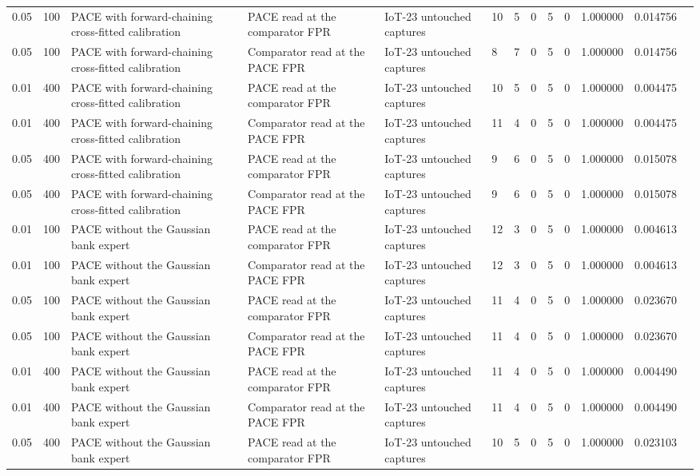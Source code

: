 \begin{tabular}{lllllllllllll}
0.05 & 100 & PACE with forward-chaining cross-fitted calibration & PACE read at the comparator FPR & IoT-23 untouched captures & 10 & 5 & 0 & 5 & 0 & 1.000000 & 0.014756 &  \\
0.05 & 100 & PACE with forward-chaining cross-fitted calibration & Comparator read at the PACE FPR & IoT-23 untouched captures & 8 & 7 & 0 & 5 & 0 & 1.000000 & 0.014756 &  \\
0.01 & 400 & PACE with forward-chaining cross-fitted calibration & PACE read at the comparator FPR & IoT-23 untouched captures & 10 & 5 & 0 & 5 & 0 & 1.000000 & 0.004475 &  \\
0.01 & 400 & PACE with forward-chaining cross-fitted calibration & Comparator read at the PACE FPR & IoT-23 untouched captures & 11 & 4 & 0 & 5 & 0 & 1.000000 & 0.004475 &  \\
0.05 & 400 & PACE with forward-chaining cross-fitted calibration & PACE read at the comparator FPR & IoT-23 untouched captures & 9 & 6 & 0 & 5 & 0 & 1.000000 & 0.015078 &  \\
0.05 & 400 & PACE with forward-chaining cross-fitted calibration & Comparator read at the PACE FPR & IoT-23 untouched captures & 9 & 6 & 0 & 5 & 0 & 1.000000 & 0.015078 &  \\
0.01 & 100 & PACE without the Gaussian bank expert & PACE read at the comparator FPR & IoT-23 untouched captures & 12 & 3 & 0 & 5 & 0 & 1.000000 & 0.004613 &  \\
0.01 & 100 & PACE without the Gaussian bank expert & Comparator read at the PACE FPR & IoT-23 untouched captures & 12 & 3 & 0 & 5 & 0 & 1.000000 & 0.004613 &  \\
0.05 & 100 & PACE without the Gaussian bank expert & PACE read at the comparator FPR & IoT-23 untouched captures & 11 & 4 & 0 & 5 & 0 & 1.000000 & 0.023670 &  \\
0.05 & 100 & PACE without the Gaussian bank expert & Comparator read at the PACE FPR & IoT-23 untouched captures & 11 & 4 & 0 & 5 & 0 & 1.000000 & 0.023670 &  \\
0.01 & 400 & PACE without the Gaussian bank expert & PACE read at the comparator FPR & IoT-23 untouched captures & 11 & 4 & 0 & 5 & 0 & 1.000000 & 0.004490 &  \\
0.01 & 400 & PACE without the Gaussian bank expert & Comparator read at the PACE FPR & IoT-23 untouched captures & 11 & 4 & 0 & 5 & 0 & 1.000000 & 0.004490 &  \\
0.05 & 400 & PACE without the Gaussian bank expert & PACE read at the comparator FPR & IoT-23 untouched captures & 10 & 5 & 0 & 5 & 0 & 1.000000 & 0.023103 &  \\

\end{tabular}
